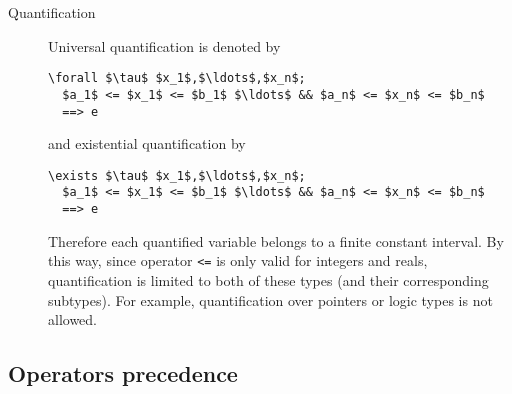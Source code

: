 \begin{description}
\item[Quantification] Universal quantification is denoted by
\begin{lstlisting}
\forall $\tau$ $x_1$,$\ldots$,$x_n$;
  $a_1$ <= $x_1$ <= $b_1$ $\ldots$ && $a_n$ <= $x_n$ <= $b_n$
  ==> e
\end{lstlisting} and existential quantification by
\begin{lstlisting}
\exists $\tau$ $x_1$,$\ldots$,$x_n$;
  $a_1$ <= $x_1$ <= $b_1$ $\ldots$ && $a_n$ <= $x_n$ <= $b_n$
  ==> e
\end{lstlisting}
Therefore each quantified variable belongs to a finite constant interval. By
this way, since operator \lstinline|<=| is only valid for integers and reals,
quantification is limited to both of these types (and their corresponding
subtypes). For example, quantification over \C pointers or logic types is not
allowed.
\end{description}


\subsection{Operators precedence}
\nodiff

